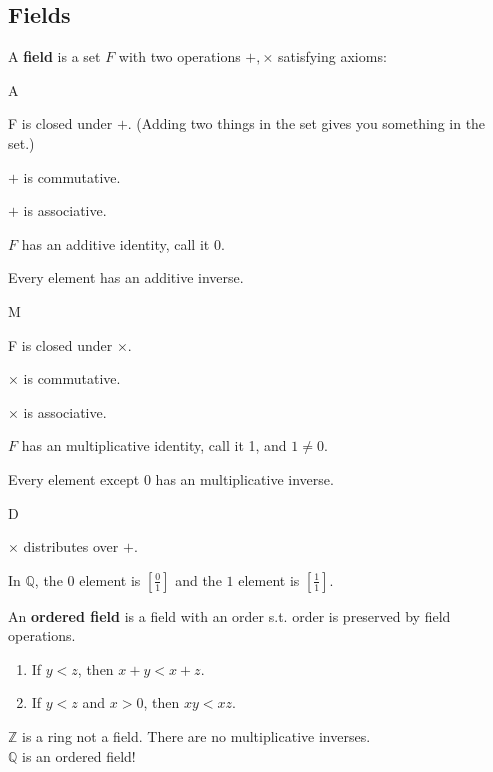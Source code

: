 \documentclass[../main.tex]{subfiles}
\begin{document}

\subsection{Fields}

\begin{definition}[Field]
    A \textbf{field} is a set \( F \) with two operations \( +, \times \) satisfying axioms:
    \begin{axioms}{A}
        \item F is closed under \( + \). (Adding two things in the set gives you something in the set.)
        \item \( + \) is commutative.
        \item \( + \) is associative.
        \item \( F \) has an additive identity, call it 0.
        \item Every element has an additive inverse.
    \end{axioms}
    \begin{axioms}{M}
        \item F is closed under \( \times \).
        \item \( \times \) is commutative.
        \item \( \times \) is associative.
        \item \( F \) has an multiplicative identity, call it 1, and \( 1 \neq 0 \).
        \item Every element except \( 0 \) has an multiplicative inverse.
    \end{axioms}
    \begin{axioms}{D}
        \item \( \times \) distributes over \( + \).
    \end{axioms}
\end{definition}

\begin{example}[]
    In \( \mathbb{Q} \), the \( 0 \) element is \( \displaystyle \left[ \frac{0}{1} \right]\)
    and the \( 1 \) element is \( \displaystyle \left[ \frac{1}{1} \right] \).
\end{example}

\begin{definition}
    An \textbf{ordered field} is a field with an order s.t. order is preserved by field operations.
    \begin{enumerate}
        \item If \( y<z \), then \( x+y <x+z \).
        \item If \( y<z \) and \( x>0 \), then \( xy<xz \).
    \end{enumerate}
\end{definition}

\begin{note}
    \( \mathbb{Z} \) is a ring not a field. There are no multiplicative inverses. \\
    \( \mathbb{Q} \) is an ordered field!
\end{note}
\end{document}

